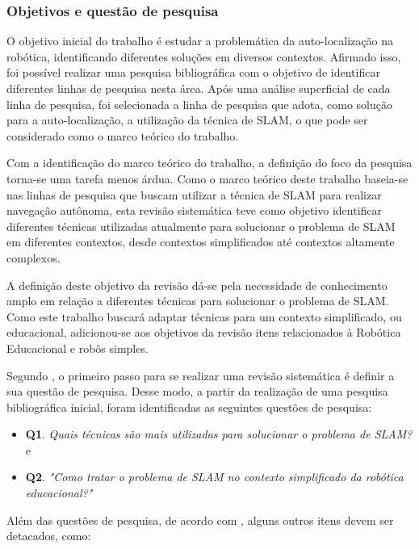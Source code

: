 		\subsubsection{Objetivos e questão de pesquisa}
		
		O objetivo inicial do trabalho é estudar a problemática da auto-localização na robótica, identificando diferentes soluções em diversos contextos. Afirmado isso, foi possível realizar uma pesquisa bibliográfica com o objetivo de identificar diferentes linhas de pesquisa nesta área. Após uma análise superficial de cada linha de pesquisa, foi selecionada a linha de pesquisa que adota, como solução para a auto-localização, a utilização da técnica de SLAM, o que pode ser considerado como o marco teórico do trabalho. 

		Com a identificação do marco teórico do trabalho, a definição do foco da pesquisa torna-se uma tarefa menos árdua. Como o marco teórico deste trabalho baseia-se nas linhas de pesquisa que buscam utilizar a técnica de SLAM para realizar navegação autônoma, esta revisão sistemática teve como objetivo identificar diferentes técnicas utilizadas atualmente para solucionar o problema de SLAM em diferentes contextos, desde contextos simplificados até contextos altamente complexos.

		A definição deste objetivo da revisão dá-se pela necessidade de conhecimento amplo em relação a diferentes técnicas para solucionar o problema de SLAM. Como este trabalho buscará adaptar técnicas para um contexto simplificado, ou educacional, adicionou-se aos objetivos da revisão itens relacionados à Robótica Educacional e robôs simples.

		Segundo \cite{Kitchenham}, o primeiro passo para se realizar uma revisão sistemática é definir a sua questão de pesquisa. Desse modo, a partir da realização de uma pesquisa bibliográfica inicial, foram identificadas as seguintes questões de pesquisa: 

		\begin{itemize}
			\item \textbf{Q1}. \textit{Quais técnicas são mais utilizadas para solucionar o problema de SLAM?} e
			\item \textbf{Q2}. \textit{"Como tratar o problema de SLAM no contexto simplificado da robótica educacional?"}
		\end{itemize}

		Além das questões de pesquisa, de acordo com \cite{exemploRevisaoSistematica}, alguns outros itens devem ser detacados, como:

